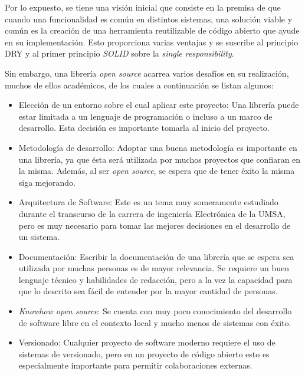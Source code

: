 Por lo expuesto, se tiene una visión inicial que consiste en la premisa de que
cuando una funcionalidad es común en distintos sistemas, una solución viable y
común es la creación de una herramienta reutilizable de código abierto que ayude
en su implementación. Esto proporciona varias ventajas y se suscribe al
principio DRY  y al primer principio \textit{SOLID}
sobre la \textit{single responsibility}.

Sin embargo, una librería \textit{open source} acarrea varios desafíos en su realización,
muchos de ellos académicos, de los cuales a continuación se listan algunos:

\begin{itemize}

	\item Elección de un entorno sobre el cual aplicar este proyecto: Una
	      librería puede estar limitada a un lenguaje de programación o incluso a
	      un marco de desarrollo. Esta decisión es importante tomarla al inicio
	      del proyecto.

	\item Metodología de desarrollo: Adoptar una buena metodología es importante
	      en una librería, ya que ésta será utilizada por muchos proyectos que
	      confiaran en la misma. Además, al ser \textit{open source}, se espera que de
	      tener éxito la misma siga mejorando.

	\item Arquitectura de Software: Este es un tema muy someramente estudiado
	      durante el transcurso de la carrera de ingeniería Electrónica de la
	      UMSA, pero es muy necesario para tomar las mejores decisiones en el
	      desarrollo de un sistema.

	\item Documentación: Escribir la documentación de una librería que se espera
	      sea utilizada por muchas personas es de mayor relevancia. Se requiere un
	      buen lenguaje técnico y habilidades de redacción, pero a la vez la
	      capacidad para que lo descrito sea fácil de entender por la mayor
	      cantidad de personas.

	\item \textit{Knowhow open source}: Se cuenta con muy poco conocimiento del
	      desarrollo de software libre en el contexto local y mucho menos de
	      sistemas con éxito.

	\item Versionado: Cualquier proyecto de software moderno requiere el uso de
	      sistemas de versionado, pero en un proyecto de código abierto esto es
	      especialmente importante para permitir colaboraciones externas.


\end{itemize}
